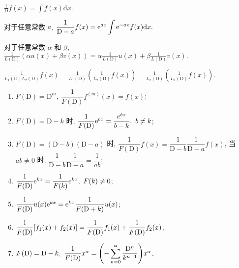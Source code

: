 \begin{theorem}
    $\displaystyle\frac{1}{\mathrm{D}}f(x)=\int f(x)\mathrm{d}x.$
\end{theorem}
\begin{theorem}
    对于任意常数 $a$, $\displaystyle\frac{1}{\mathrm{D}-a}f(x)=\mathrm{e} ^{ax}\int\mathrm{e} ^{-ax}f(x)\mathrm{d}x.$
\end{theorem}
\begin{theorem}
    对于任意常数 $\alpha$ 和 $\beta$, $\displaystyle\frac{1}{L(\mathrm{D})}(\alpha u(x)+\beta v(x))=\alpha\frac{1}{L(\mathrm{D})}u(x)+\beta\frac{1}{L(\mathrm{D})}v(x).$
\end{theorem}
\begin{theorem}
    $\displaystyle\frac{1}{L_1(\mathrm{D})L_2(\mathrm{D})}f(x)=\frac{1}{L_1(\mathrm{D})}\left(\frac{1}{L_2(\mathrm{D})}f(x)\right)=\frac{1}{L_2(\mathrm{D})}\left(\frac{1}{L_1(\mathrm{D})}f(x)\right).$
\end{theorem}

\begin{theorem}[算子特性]
    \begin{enumerate}[label=(\arabic{*})]
        \item $F(\mathrm{D})=\mathrm{D}^m,~\dfrac{1}{F(\mathrm{D})}f^{(m)}(x)=f(x)$;
        \item $F(\mathrm{D})=\mathrm{D}-k$ 时, $\dfrac{1}{F(\mathrm{D})}\mathrm{e}^{bx}=\dfrac{e^{bx}}{b-k},~b\neq k$;
        \item $F(\mathrm{D})=(\mathrm{D}-b)(\mathrm{D}-a)$ 时, $\dfrac{1}{F(\mathrm{D})}f(x)=\dfrac{1}{\mathrm{D}-b}\dfrac{1}{\mathrm{D}-a}f(x)$, 当 $ab\neq0$ 时, $\dfrac{1}{\mathrm{D}-b}\dfrac{1}{\mathrm{D}-a}=\dfrac{1}{ab}$;
        \item $\dfrac{1}{F(\mathrm{D})}\mathrm{e}^{kx}=\dfrac{1}{F(k)}\mathrm{e}^{kx},~F(k)\neq0$;
        \item $\dfrac{1}{F(\mathrm{D})}u(x)\mathrm{e}^{kx}=\mathrm{e}^{kx}\dfrac{1}{F(\mathrm{D}+k)}u(x)$;
        \item $\dfrac{1}{F(\mathrm{D})}\qty[f_1(x)+f_2(x)]=\dfrac{1}{F(\mathrm{D})}f_1(x)+\dfrac{1}{F(\mathrm{D})}f_2(x)$;
        \item $F(\mathrm{D})=\mathrm{D}-k,~\dfrac{1}{F(\mathrm{D})}x^{\alpha}=\qty(-\displaystyle\sum_{n=0}^{\alpha}\dfrac{\mathrm{D}^n}{k^{n+1}})x^{\alpha}$.
    \end{enumerate}
\end{theorem}

